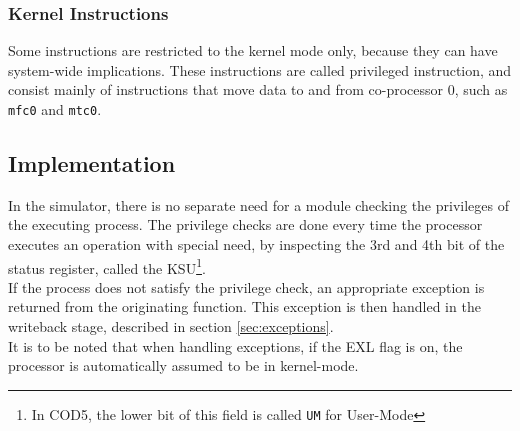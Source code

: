 \subsubsection{Kernel Instructions}
Some instructions are restricted to the kernel mode only, because they can have
system-wide implications. These instructions are called privileged
instruction, and consist mainly of instructions that move data to and from
co-processor 0, such as \texttt{mfc0} and \texttt{mtc0}.


\subsection{Implementation}
In the simulator, there is no separate need for a module checking the
privileges of the executing process. The privilege checks are done every time
the processor executes an operation with special need, by inspecting the 3rd
and 4th bit of the status register, called the KSU\footnote{In COD5, the lower
bit of this field is called \texttt{UM} for User-Mode\cite{COD5}}.\\
If the process does not satisfy the privilege check, an appropriate exception
is returned from the originating function. This exception is then handled in the writeback
stage, described in section \ref{sec:exceptions}.\\
It is to be noted that when handling exceptions, if the EXL flag is on, the
processor is automatically assumed to be in kernel-mode\cite{see_mips_run}.
